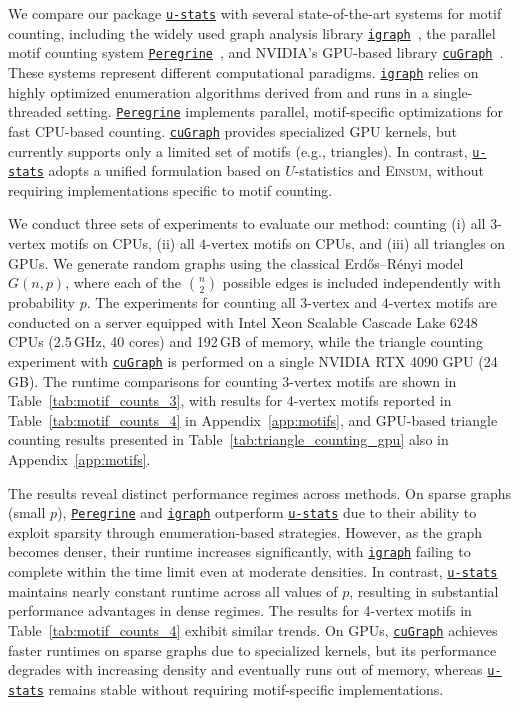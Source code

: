 \documentclass[12pt]{article}
\newcommand{\libref}[2]{\href{#2}{\texttt{#1}}}
\def\package{\libref{u-stats}{https://github.com/zrq1706/U-Statistics-Python}}
\def\igraph{\libref{igraph}{https://igraph.org/}}
\theoremstyle{plain}
\theoremstyle{definition}
\def\Einsum{\textsc{Einsum}}
\def\package{\libref{u-stats}{https://github.com/zrq1706/U-Statistics-Python}}
\def\igraph{\libref{igraph}{https://igraph.org/}}
\def\peregrine{\libref{Peregrine}{https://github.com/pdclab/peregrine}}
\def\cugraph{\libref{cuGraph}{https://docs.rapids.ai/api/cugraph/stable/}}
\begin{document}
\begin{bibunit}[agsm]
We compare our package \package{} with several state-of-the-art systems for motif counting, including the widely used graph analysis library \igraph{}~\citep{csardi2006igraph}, the parallel motif counting system \peregrine{}~\citep{jamshidi2020peregrine}, and NVIDIA's GPU-based library \cugraph{}~\citep{fender2022rapids}. These systems represent different computational paradigms. 
\igraph{} relies on highly optimized enumeration algorithms derived from \citet{wernicke2006fanmod} and runs in a single-threaded setting. 
\peregrine{} implements parallel, motif-specific optimizations for fast CPU-based counting. 
\cugraph{} provides specialized GPU kernels, but currently supports only a limited set of motifs (e.g., triangles). In contrast, \package{} adopts a unified formulation based on $U$-statistics and \Einsum{}, without requiring implementations specific to motif counting.

We conduct three sets of experiments to evaluate our method: counting (i) all $3$-vertex motifs on CPUs, (ii) all $4$-vertex motifs on CPUs, and (iii) all triangles on GPUs. 
We generate random graphs using the classical Erd\H{o}s--R\'enyi model $G(n, p)$, where each of the $\binom{n}{2}$ possible edges is included independently with probability $p$. The experiments for counting all $3$-vertex and $4$-vertex motifs are conducted on a server equipped with Intel Xeon Scalable Cascade Lake 6248 CPUs (2.5\,GHz, 40 cores) and 192\,GB of memory, while the triangle counting experiment with \cugraph{} is performed on a single NVIDIA RTX 4090 GPU (24\,GB). 
The runtime comparisons for counting 3-vertex motifs are shown in Table~\ref{tab:motif_counts_3}, with results for 4-vertex motifs reported in Table~\ref{tab:motif_counts_4} in Appendix~\ref{app:motifs}, and GPU-based triangle counting results presented in Table~\ref{tab:triangle_counting_gpu} also in Appendix~\ref{app:motifs}.

The results reveal distinct performance regimes across methods. 
On sparse graphs (small $p$), \peregrine{} and  \igraph{} outperform \package{} due to their ability to exploit sparsity through enumeration-based strategies. 
However, as the graph becomes denser, their runtime increases significantly, with \igraph{} failing to complete within the time limit even at moderate densities. In contrast, \package{} maintains nearly constant runtime across all values of $p$, resulting in substantial performance advantages in dense regimes. 
The results for 4-vertex motifs in Table~\ref{tab:motif_counts_4} exhibit similar trends. 
On GPUs, \cugraph{} achieves faster runtimes on sparse graphs due to specialized kernels, but its performance degrades with increasing density and eventually runs out of memory, whereas \package{} remains stable without requiring motif-specific implementations.


\end{bibunit}
\end{document}
